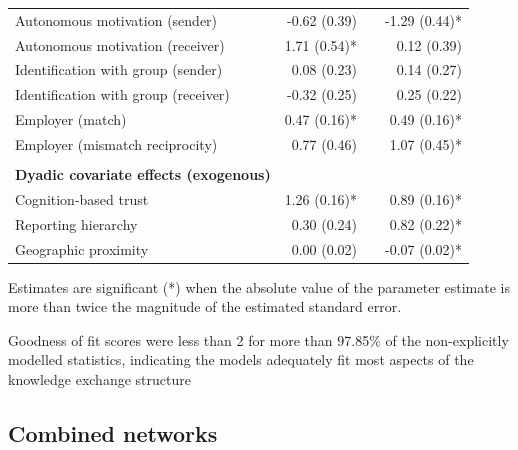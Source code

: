 \begin{table}[hbt!]
{\begin{threeparttable}
\begin{tabular}{@{}lrlr@{}}
Autonomous motivation (sender) & -0.62 (0.39)\phantom{*} &  & -1.29 (0.44)* \\
Autonomous motivation (receiver) & 1.71 (0.54)* &  & 0.12 (0.39)\phantom{*} \\
Identification with group (sender) & 0.08 (0.23)\phantom{*} &  & 0.14 (0.27)\phantom{*} \\
Identification with group (receiver) & -0.32 (0.25)\phantom{*} &  & 0.25 (0.22)\phantom{*} \\
Employer (match) & 0.47 (0.16)* &  & 0.49 (0.16)* \\
Employer (mismatch reciprocity) & 0.77 (0.46)\phantom{*} &  & 1.07 (0.45)* \\
 &  &  &  \\
\textbf{Dyadic covariate effects (exogenous)} &  &  &  \\
Cognition-based trust & 1.26 (0.16)* &  & 0.89 (0.16)* \\
Reporting hierarchy & 0.30 (0.24)\phantom{*} &  & 0.82 (0.22)* \\
Geographic proximity & 0.00 (0.02)\phantom{*} &  & -0.07 (0.02)* \\ \bottomrule
\end{tabular}
    \begin{tablenotes}
      \small
      \item Estimates are significant (*) when the absolute value of the parameter estimate is more than twice the magnitude of the estimated standard error.
      \item Goodness of fit scores were less than 2 for more than 97.85\% of the non-explicitly modelled statistics, indicating the models adequately fit most aspects of the knowledge exchange structure
    \end{tablenotes}
\end{threeparttable}
}
\end{table}

\subsection{Combined networks}

